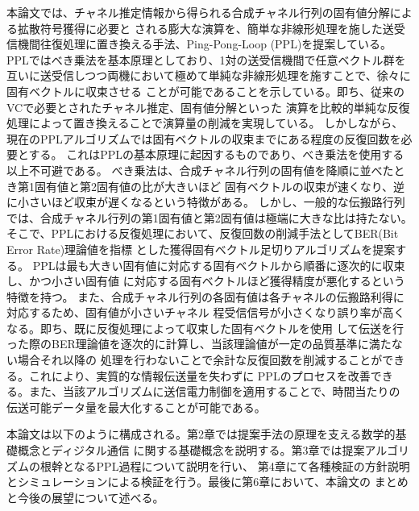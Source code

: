 本論文では、チャネル推定情報から得られる合成チャネル行列の固有値分解による拡散符号獲得に必要と
される膨大な演算を、簡単な非線形処理を施した送受信機間往復処理に置き換える手法、Ping-Pong-Loop
(PPL)を提案している。PPLではべき乗法を基本原理としており、1対の送受信機間で任意ベクトル群を
互いに送受信しつつ両機において極めて単純な非線形処理を施すことで、徐々に固有ベクトルに収束させる
ことが可能であることを示している。即ち、従来のVCで必要とされたチャネル推定、固有値分解といった
演算を比較的単純な反復処理によって置き換えることで演算量の削減を実現している。
しかしながら、現在のPPLアルゴリズムでは固有ベクトルの収束までにある程度の反復回数を必要とする。
これはPPLの基本原理に起因するものであり、べき乗法を使用する以上不可避である。
べき乗法は、合成チャネル行列の固有値を降順に並べたとき第1固有値と第2固有値の比が大きいほど
固有ベクトルの収束が速くなり、逆に小さいほど収束が遅くなるという特徴がある。
しかし、一般的な伝搬路行列では、合成チャネル行列の第1固有値と第2固有値は極端に大きな比は持たない。
そこで、PPLにおける反復処理において、反復回数の削減手法としてBER(Bit Error Rate)理論値を指標
とした獲得固有ベクトル足切りアルゴリズムを提案する。
PPLは最も大きい固有値に対応する固有ベクトルから順番に逐次的に収束し、かつ小さい固有値
に対応する固有ベクトルほど獲得精度が悪化するという特徴を持つ。
また、合成チャネル行列の各固有値は各チャネルの伝搬路利得に対応するため、固有値が小さいチャネル
程受信信号が小さくなり誤り率が高くなる。即ち、既に反復処理によって収束した固有ベクトルを使用
して伝送を行った際のBER理論値を逐次的に計算し、当該理論値が一定の品質基準に満たない場合それ以降の
処理を行わないことで余計な反復回数を削減することができる。これにより、実質的な情報伝送量を失わずに
PPLのプロセスを改善できる。また、当該アルゴリズムに送信電力制御を適用することで、時間当たりの
伝送可能データ量を最大化することが可能である。

本論文は以下のように構成される。第2章では提案手法の原理を支える数学的基礎概念とディジタル通信
に関する基礎概念を説明する。第3章では提案アルゴリズムの根幹となるPPL過程について説明を行い、
第4章にて各種検証の方針説明とシミュレーションによる検証を行う。最後に第6章において、本論文の
まとめと今後の展望について述べる。